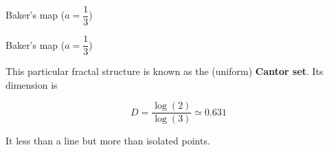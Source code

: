 \documentclass[usenames, dvipsnames, aspectratio=169]{beamer}
\begin{document}
{\begin{frame}[t, c]{Baker's map ($a = \dfrac{1}{3}$)}{}
\begin{overprint}
    \end{overprint}

    \vfill
  \end{frame}

}

\begin{frame}[t, c]{Baker's map ($a = \dfrac{1}{3}$)}{}
    \vfill
    \large

    \begin{minipage}{.38\textwidth}
      \centering
    \end{minipage}%
    \hfill
    \begin{minipage}{.58\textwidth}
      This particular fractal structure is known as the (uniform) \textbf{\alert{Cantor set}}.
      Its dimension is

      \[
      D = \dfrac{\log(2)}{\log(3)} \simeq 0.631
      \]

      \medskip

      It less than a line but more than isolated points.
    \end{minipage}

    \vfill
\end{frame}
\end{document}
